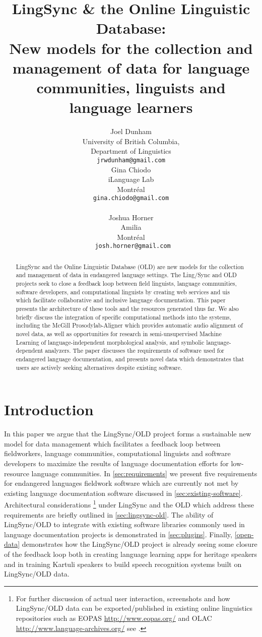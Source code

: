 \documentclass[11pt]{article}
\title{LingSync \& the Online Linguistic Database:\\New models for the
    collection and management of data for language communities, linguists and
language learners}
\author{Joel Dunham \\
University of British Columbia,   \\
Department of Linguistics \\
{\tt jrwdunham@gmail.com} \\\And
Gina Chiodo \\
iLanguage Lab \\
Montr\'eal \\
{\tt gina.chiodo@gmail.com} \\  \\\And
Joshua Horner \\
Amilia  \\
Montr\'eal \\
{\tt ~josh.horner@gmail.com} \\ }
\date{}
\begin{document}
\maketitle

\begin{abstract}
LingSync and the Online Linguistic Database (OLD) are new models for the
collection and management of data in endangered language settings. The
Ling\-/Sync and OLD projects seek to close a feedback loop  between field
linguists, language communities, software developers, and computational
linguists by creating web services and \glspl{ui} which facilitate
collaborative and inclusive language documentation. This paper presents the
architecture of these tools and the resources generated thus far. We also
briefly discuss the integration of specific computational methods into the
systems, including the McGill Prosodylab-Aligner which provides automatic audio
alignment of novel data, as well as opportunities for research in
semi-unsupervised Machine Learning of language-independent morphological
analysis, and symbolic language-dependent analyzers. The paper discusses the
requirements of software used for endangered language documentation, and
presents novel data which demonstrates that users are actively seeking
alternatives despite existing software.
\end{abstract}


\section{Introduction}

In this paper we argue that the LingSync/OLD project forms a sustainable new
model for data management which facilitates a feedback loop between
fieldworkers, language communities, computational linguists and software
developers to maximize the results of language documentation efforts for
low-resource language communities. In \autoref{sec:requirements} we present
five requirements for endangered languages fieldwork software  which are
currently not met by existing language documentation software discussed in
\autoref{sec:existing-software}. Architectural considerations%
\footnote{For further discussion of actual user interaction, screenshots and
    how LingSync/OLD data can be exported/published in existing online
    linguistics repositories such as EOPAS \url{http://www.eopas.org/} and OLAC
    \url{http://www.language-archives.org/} see \cite{lingsync:2012}.} %
under LingSync and the OLD which address these requirements are briefly
outlined in \autoref{sec:lingsync-old}.  The ability of LingSync/OLD to
integrate with existing software libraries commonly used in language
documentation projects is demonstrated in \autoref{sec:plugins}. Finally,
\autoref{open-data} demonstrates how the LingSync/OLD project is already
seeing some closure of the feedback loop both in creating language learning
apps for heritage speakers and in training Kartuli speakers to build speech
recognition systems built on LingSync/OLD data.
\end{document}
